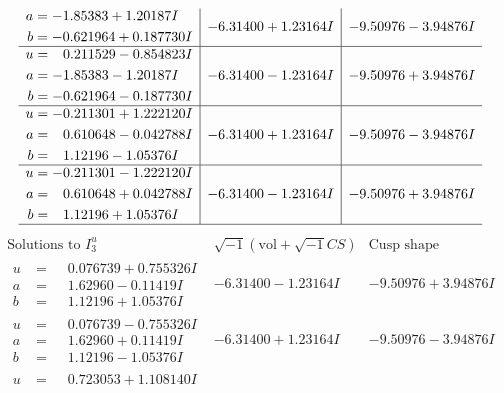 \documentclass[1p]{elsarticle_modified}
\theoremstyle{definition}
\newcommand{\I}{\sqrt{-1}}
\begin{document}
$$\begin{array}{c|c|c}
\begin{aligned}
a &= -1.85383 + 1.20187 I \\
b &= -0.621964 + 0.187730 I\end{aligned}
 & -6.31400 + 1.23164 I & -9.50976 - 3.94876 I \\ \hline\begin{aligned}
u &= \phantom{-}0.211529 - 0.854823 I \\
a &= -1.85383 - 1.20187 I \\
b &= -0.621964 - 0.187730 I\end{aligned}
 & -6.31400 - 1.23164 I & -9.50976 + 3.94876 I \\ \hline\begin{aligned}
u &= -0.211301 + 1.222120 I \\
a &= \phantom{-}0.610648 - 0.042788 I \\
b &= \phantom{-}1.12196 - 1.05376 I\end{aligned}
 & -6.31400 + 1.23164 I & -9.50976 - 3.94876 I \\ \hline\begin{aligned}
u &= -0.211301 - 1.222120 I \\
a &= \phantom{-}0.610648 + 0.042788 I \\
b &= \phantom{-}1.12196 + 1.05376 I\end{aligned}
 & -6.31400 - 1.23164 I & -9.50976 + 3.94876 I\\
 \hline 
 \end{array}$$\newpage$$\begin{array}{c|c|c}  
\text{Solutions to }I^u_{3}& \I (\text{vol} + \sqrt{-1}CS) & \text{Cusp shape}\\
 \hline 
\begin{aligned}
u &= \phantom{-}0.076739 + 0.755326 I \\
a &= \phantom{-}1.62960 - 0.11419 I \\
b &= \phantom{-}1.12196 + 1.05376 I\end{aligned}
 & -6.31400 - 1.23164 I & -9.50976 + 3.94876 I \\ \hline\begin{aligned}
u &= \phantom{-}0.076739 - 0.755326 I \\
a &= \phantom{-}1.62960 + 0.11419 I \\
b &= \phantom{-}1.12196 - 1.05376 I\end{aligned}
 & -6.31400 + 1.23164 I & -9.50976 - 3.94876 I \\ \hline\begin{aligned}
u &= \phantom{-}0.723053 + 1.108140 I \\

\end{aligned}
\end{array}$$
\end{document}
